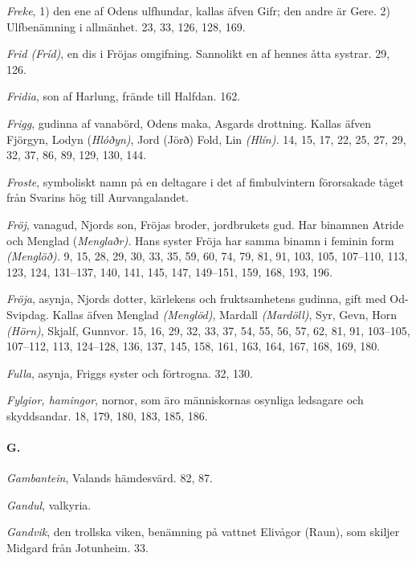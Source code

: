 \emph{Freke}, 1) den ene af Odens ulfhundar, kallas äfven Gifr; den
andre är Gere. 2) Ulfbenämning i allmänhet. 23, 33, 126, 128, 169.

\emph{Frid (Fríd)}, en dis i Fröjas omgifning. Sannolikt en af hennes
åtta systrar. 29, 126.

\emph{Fridia}, son af Harlung, frände till Halfdan. 162.

\emph{Frigg}, gudinna af vanabörd, Odens maka, Asgards drottning. Kallas
äfven Fjörgyn, Lodyn (\emph{Hlóðyn)}, Jord (Jörð) Fold, Lin
\emph{(Hlín).} 14, 15, 17, 22, 25, 27, 29, 32, 37, 86, 89, 129, 130,
144.

\emph{Froste}, symboliskt namn på en deltagare i det af fimbulvintern
förorsakade tåget från Svarins hög till Aurvangalandet.

\emph{Fröj}, vanagud, Njords son, Fröjas broder, jordbrukets gud. Har
binamnen Atride och Menglad (\emph{Menglaðr).} Hans syster Fröja har
samma binamn i feminin form \emph{(Menglöð).} 9, 15, 28, 29, 30, 33, 35,
59, 60, 74, 79, 81, 91, 103, 105, 107--110, 113, 123, 124, 131--137,
140, 141, 145, 147, 149--151, 159, 168, 193, 196.

\emph{Fröja}, asynja, Njords dotter, kärlekens och fruktsamhetens
gudinna, gift med Od-Svipdag. Kallas äfven Menglad \emph{(Menglöd)},
Mardall \emph{(Mardöll)}, Syr, Gevn, Horn \emph{(Hörn)}, Skjalf,
Gunnvor. 15, 16, 29, 32, 33, 37, 54, 55, 56, 57, 62, 81, 91, 103--105,
107--112, 113, 124--128, 136, 137, 145, 158, 161, 163, 164, 167, 168,
169, 180.

\emph{Fulla}, asynja, Friggs syster och förtrogna. 32, 130.

\emph{Fylgior, hamingor}, nornor, som äro människornas osynliga
ledsagare och skyddsandar. 18, 179, 180, 183, 185, 186.

\paragraph{G.}

\emph{Gambantein}, Valands hämdesvärd. 82, 87.

\emph{Gandul}, valkyria.

\protect\hypertarget{lb1625905.xhtmlux5cux23start217}{}{}\protect\hypertarget{lb1625905.xhtmlux5cux23start217-a}{}{}\protect\hypertarget{lb1625905.xhtmlux5cux23start217-b}{}{}\protect\hypertarget{lb1625905.xhtmlux5cux23start217-c}{}{}\protect\hypertarget{lb1625905.xhtmlux5cux23start217-d}{}{}

\emph{Gandvik}, den trollska viken, benämning på vattnet Elivågor
(Raun), som skiljer Midgard från Jotunheim. 33.

